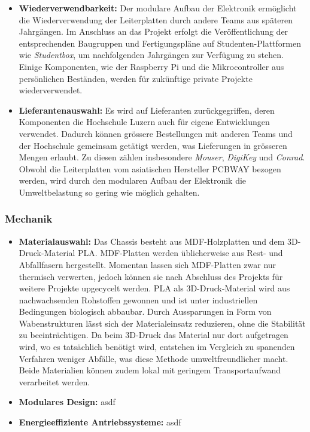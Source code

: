 \documentclass[../../main.tex]{subfiles} %
\begin{document}
\begin{itemize}
  \item \textbf{Wiederverwendbarkeit:} Der modulare Aufbau der Elektronik ermöglicht die
        Wiederverwendung der Leiterplatten durch andere Teams aus späteren Jahrgängen. Im 
        Anschluss an das Projekt erfolgt die Veröffentlichung der entsprechenden Baugruppen 
        und Fertigungspläne auf Studenten-Plattformen wie \textit{Studentbox}, um nachfolgenden 
        Jahrgängen zur Verfügung zu stehen. Einige Komponenten, wie der Raspberry Pi und 
        die Mikrocontroller aus persönlichen Beständen, werden für zukünftige private 
        Projekte wiederverwendet.

  \item \textbf{Lieferantenauswahl:} Es wird auf Lieferanten zurückgegriffen, deren Komponenten
        die Hochschule Luzern auch für eigene Entwicklungen verwendet. Dadurch können grössere Bestellungen mit
        anderen Teams und der Hochschule gemeinsam getätigt werden, was Lieferungen in grösseren Mengen erlaubt.
        Zu diesen zählen insbesondere \textit{Mouser}, \textit{DigiKey} und \textit{Conrad}.
        Obwohl die Leiterplatten vom asiatischen Hersteller PCBWAY bezogen werden, wird durch den modularen
        Aufbau der Elektronik die Umweltbelastung so gering wie möglich gehalten.
\end{itemize}

\subsubsection{Mechanik}

\begin{itemize}
  \item \textbf{Materialauswahl:} 
  Das Chassis besteht aus MDF-Holzplatten und dem 3D-Druck-Material PLA. 
  MDF-Platten werden üblicherweise aus Rest- und Abfallfasern hergestellt. 
  Momentan lassen sich MDF-Platten zwar nur thermisch verwerten, jedoch können 
  sie nach Abschluss des Projekts für weitere Projekte upgecycelt werden.
  PLA als 3D-Druck-Material wird aus nachwachsenden Rohstoffen gewonnen und ist 
  unter industriellen Bedingungen biologisch abbaubar. Durch Aussparungen in Form 
  von Wabenstrukturen lässt sich der Materialeinsatz reduzieren, ohne die Stabilität 
  zu beeinträchtigen. Da beim 3D-Druck das Material nur dort aufgetragen wird, wo es 
  tatsächlich benötigt wird, entstehen im Vergleich zu spanenden Verfahren weniger Abfälle, 
  was diese Methode umweltfreundlicher macht.
  Beide Materialien können zudem lokal mit geringem Transportaufwand verarbeitet werden.

      

  \item \textbf{Modulares Design:} asdf


  \item \textbf{Energieeffiziente Antriebssysteme:} asdf
\end{itemize}
\end{document}
